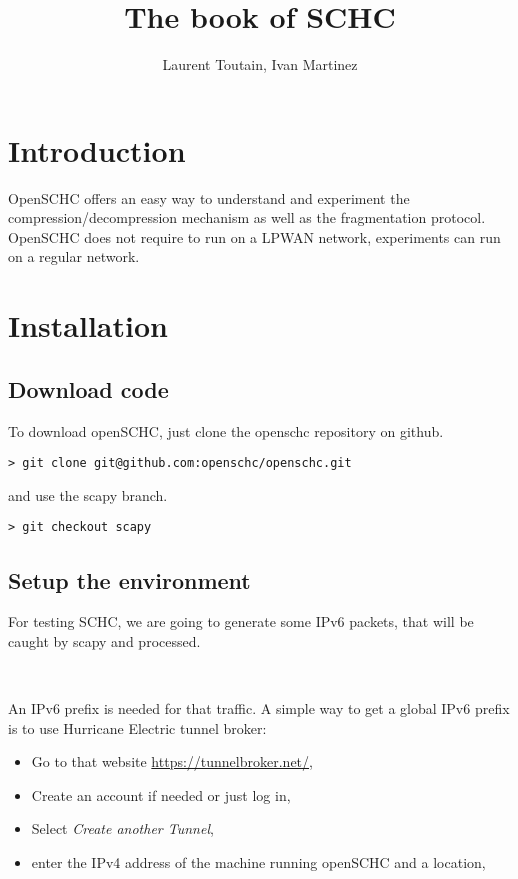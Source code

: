 \documentclass[onecolumn,12pt]{book}
\title{The book of SCHC}
\author{%
  \large Laurent Toutain, Ivan Martinez
  }
\newcounter{c}
\begin{document}
\maketitle
\tableofcontents

\chapter{Introduction}

OpenSCHC offers an easy way to understand and experiment the compression/decompression mechanism as well as the fragmentation protocol. OpenSCHC does not require to run on a LPWAN network, experiments can run on a regular network.


\chapter{Installation}\label{chap-plat}

\section{Download code}

To download openSCHC, just clone the openschc repository on github.


\begin{lstlisting}
> git clone git@github.com:openschc/openschc.git
\end{lstlisting}

and use the scapy branch.

\begin{lstlisting}
> git checkout scapy
\end{lstlisting}

\section{Setup the environment}

For testing SCHC, we are going to generate some IPv6 packets, that will be caught by scapy and processed. 

~

An IPv6 prefix is needed for that traffic. A simple way to get a global IPv6 prefix is to use Hurricane Electric tunnel broker:
\begin{itemize}
\item Go to that website \url{https://tunnelbroker.net/}, 
\item Create an account if needed or just log in, 
\item Select \textit{Create another Tunnel},
\item enter the IPv4 address of the machine running openSCHC and a location,
\end{itemize}
\end{document}
